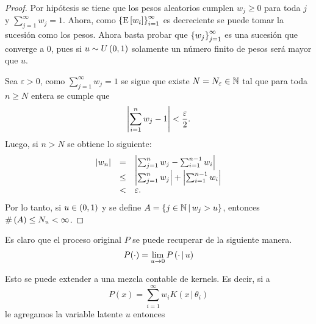 \documentclass[runningheads,a4paper]{article}
\begin{document}
\begin{proof}
Por hipótesis se tiene que los pesos aleatorios cumplen $w_{j} \geq 0$ para toda $j$ y $\sum_{j = 1}^{\infty} w_{j} = 1$. %
Ahora, como $\left\{ \mathrm{E}\left[ w_{i} \right] \right\}_{i = 1}^{\infty}$ es decreciente se puede tomar la sucesión como los pesos. Ahora basta %
probar que $\left\{ w_{j} \right\}_{j = 1}^{\infty}$ es una sucesión que converge a $0$, pues si $u \sim U\left( 0, 1 \right)$ solamente un %
número finito de pesos será mayor que $u$.

Sea $\varepsilon > 0$, como $\sum_{j = 1}^{\infty} w_{j} = 1$ se sigue que existe $N = N_{\varepsilon} \in \mathbb{N}$ tal que %
para toda $n \geq N$ entera se cumple que 
\[
\left| \sum_{i = 1}^{n} w_{j} - 1 \right| < \frac{\varepsilon}{2}.
\]
Luego, si $n > N$ se obtiene lo siguiente:
\[
\begin{array}{rcl}
\left| w_{n} \right| & = & \left| \sum_{j = 1}^{n} w_{j} - \sum_{i = 1}^{n-1} w_{i} \right| \\
 & \leq & \left| \sum_{j = 1}^{n} w_{j} \right| + \left| \sum_{i = 1}^{n-1} w_{i} \right| \\
 & < & \varepsilon.
\end{array}
\]
Por lo tanto, si $u \in \left( 0, 1 \right)$ y se define $A = \left\{ j \in \mathbb{N} \,|\, w_{j} > u \right\}$, entonces $\#\left( A \right) \leq N_{u} < \infty$.
\end{proof}

Es claro que el proceso original $P$ se puede recuperar de la siguiente manera.
\[
P(\cdot) = \lim_{u \to 0} P\left( \cdot \,|\, u \right)
\]

Esto se puede extender a una mezcla contable de kernels. Es decir, si a
\[
P(x) = \sum_{i = 1}^{\infty} w_{i} K(x \,|\, \theta_{i})
\]
le agregamos la variable latente $u$ entonces 
\end{document}
